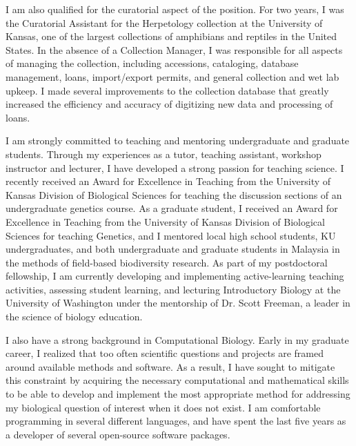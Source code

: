 \documentclass[letterpaper, 10pt]{letter}
\begin{document}
\begin{letter}
I am also qualified for the curatorial aspect of the position.
For two years, I was the Curatorial Assistant for the Herpetology
collection at the University of Kansas, one of the largest collections of
amphibians and reptiles in the United States.
In the absence of a Collection Manager, I was responsible for all aspects
of managing the collection, including accessions, cataloging, database
management, loans, import/export permits, and general collection and wet
lab upkeep.
I made several improvements to the collection database that greatly
increased the efficiency and accuracy of digitizing new data and
processing of loans.

I am strongly committed to teaching and mentoring undergraduate and
graduate students.
Through my experiences as a tutor, teaching assistant, workshop instructor
and lecturer, I have developed a strong passion for teaching science.
I recently received an Award for Excellence in Teaching from the
University of Kansas Division of Biological Sciences for teaching the
discussion sections of an undergraduate genetics course.
As a graduate student, I received an Award for Excellence in Teaching from
the University of Kansas Division of Biological Sciences for teaching
Genetics, and I mentored local high school students, KU undergraduates,
and both undergraduate and graduate students in Malaysia in the methods of
field-based biodiversity research.
As part of my postdoctoral fellowship, I am currently developing and
implementing active-learning teaching activities, assessing student
learning, and lecturing Introductory Biology at the University of
Washington under the mentorship of Dr. Scott Freeman, a leader in the
science of biology education.

I also have a strong background in Computational Biology.  Early in my graduate
career, I realized that too often scientific questions and projects are framed
around available methods and software.
As a result, I have sought to mitigate this constraint by acquiring the
necessary computational and mathematical skills to be able to develop and
implement the most appropriate method for addressing my biological question of
interest when it does not exist.
I am comfortable programming in several different languages, and have spent the
last five years as a developer of several open-source software packages.



\end{letter}
\end{document}
